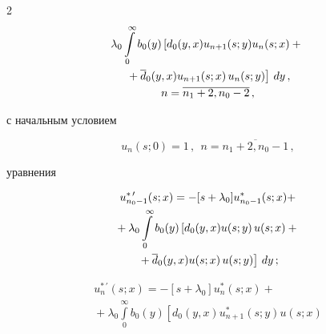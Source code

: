 \begin{multicols}{2}
\begin{multline*}
\lambda_0 \int\limits_0^\infty b_0(y) \left[d_0(y,x) u_{n+1}(s;y) u_{n}(s;x)


+{}\right.\\


\left.{}+ \d_0(y,x) u_{n+1}(s;x)\, u_{n}(s;y)\right] \, dy\,,


\\ 


n=\overline{n_1+2,n_0-2}\,,


\end{multline*}




с начальным условием


$$


u_n(s;0)= 1 \,, \ \ n=\overline{n_1+2,n_0-1}\,,


$$




уравнения


\begin{multline}


\label{5-2-m}


u^{*\,\prime}_{n_0-1}(s;x) = - [s + \lambda_0] u^*_{n_0-1}(s;x)+


\\


{}+


\lambda_0 \int\limits_0^\infty b_0(y) \left[d_0(y,x)  u(s;y)\, u(s;x)+{}\right.\\


\left.{}+


\d_0(y,x) u(s;x)\, u(s;y)\right] \, dy\,;


\end{multline}







\vspace*{-12pt}





\noindent


\begin{multline}


\label{5-2-2-m}


u^{*\,\prime}_n(s;x) = - \left[s + \lambda_0\right] u^*_{n}(s;x) +{}


\\


{}+


\lambda_0 \int\limits_0^\infty b_0(y) \left[d_0(y,x) u^*_{n+1}(s;y) u(s;x)



\end{multline}
\end{multicols}
